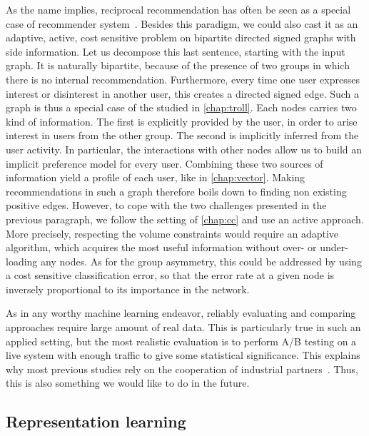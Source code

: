 As the name implies, reciprocal recommendation has often be seen as a special case of recommender
system~\autocite{Andrews2015}. Besides this paradigm, we could also cast it as an adaptive, active,
cost sensitive \esp{} problem on bipartite directed signed graphs with side information. Let us
decompose this last sentence, starting with the input graph. It is naturally bipartite, because of
the presence of two groups in which there is no internal recommendation. Furthermore, every time one
user expresses interest or disinterest in another user, this creates a directed signed edge. Such a
graph is thus a special case of the \dssn{} studied in \autoref{chap:troll}. Each nodes carries two
kind of information. The first is explicitly provided by the user, in order to arise interest in
users from the other group. The second is implicitly inferred from the user activity. In particular,
the interactions with other nodes allow us to build an implicit preference model for every user.
Combining these two sources of information yield a profile of each user, like in
\autoref{chap:vector}. Making recommendations in such a graph therefore boils down to finding non
existing positive edges. However, to cope with the two challenges presented in the previous
paragraph, we follow the setting of \autoref{chap:cc} and use an active approach. More precisely,
respecting the volume constraints would require an adaptive algorithm, which acquires the most
useful information without over- or under-loading any nodes. As for the group asymmetry, this could
be addressed by using a cost sensitive classification error, so that the error rate at a given node
is inversely proportional to its importance in the network.

As in any worthy machine learning endeavor, reliably evaluating and comparing approaches require
large amount of real data. This is particularly true in such an applied setting, but the most
realistic evaluation is to perform A/B testing on a live system with enough traffic to give some
statistical significance. This explains why most previous studies rely on the cooperation of
industrial partners~\autocites{Andrews2015}{Kille2015}{Krzywicki2015}{Xia2015}{Alanazi}. Thus, this
is also something we would like to do in the future.

\subsection{Representation learning}
\label{par:representation_learning}

